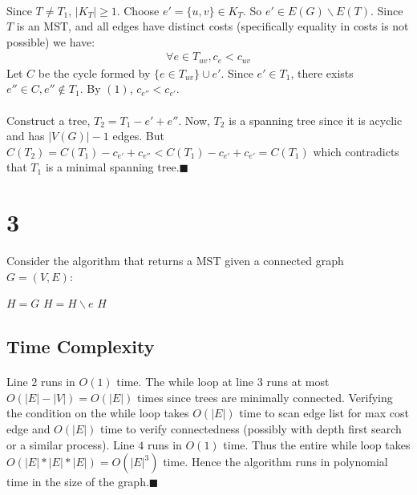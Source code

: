 \documentclass[letterpaper,12pt,oneside,onecolumn]{report}
\begin{document}
\paragraph{}
Since $T \neq T_1$, $|K_T| \geq 1$. Choose $e' = \{u,v\} \in K_T$. So $e' \in E(G) \backslash E(T)$. Since $T$ is an MST, and all edges have distinct costs (specifically equality in costs is not possible) we have:
\begin{align}
\forall e \in T_{uv}, c_e < c_{uv}
\end{align}
Let $C$ be the cycle formed by $\{e \in T_{uv} \} \cup e'$. Since $e' \in T_1$, there exists $e'' \in C, e'' \not\in T_1$. By $(1)$, $c_{e''} < c_{e'}$.
\paragraph{}
Construct a tree, $T_2 = T_1 - e' + e''$. Now, $T_2$ is a spanning tree since it is acyclic and has $|V(G)| - 1$ edges. But $C(T_2) = C(T_1) - c_{e'} + c_{e''} < C(T_1) - c_{e'} + c_{e'} = C(T_1)$ which contradicts that $T_1$ is a minimal spanning tree.$\blacksquare$
\section*{3}
Consider the algorithm that returns a MST given a connected graph $G=(V,E)$:
\begin{algorithm}
\begin{algorithmic}[1]
\Procedure{}{}
\State $H = G$
\State $H = H \backslash e$
\EndWhile
\State \Return $H$
\EndProcedure
\end{algorithmic}
\end{algorithm}
\subsection*{Time Complexity}
\paragraph{}
Line $2$ runs in $O(1)$ time.  The while loop at line $3$ runs at most $O(|E|-|V|) = O(|E|)$ times since trees are minimally connected. Verifying the condition on the while loop takes $O(|E|)$ time to scan edge list for max cost edge and $O(|E|)$ time to verify connectedness (possibly with depth first search or a similar process). Line $4$ runs in $O(1)$ time. Thus the entire while loop takes $O(|E|*|E|*|E|) = O(|E|^3)$ time. Hence the algorithm runs in polynomial time in the size of the graph.$\blacksquare$
\end{document}
